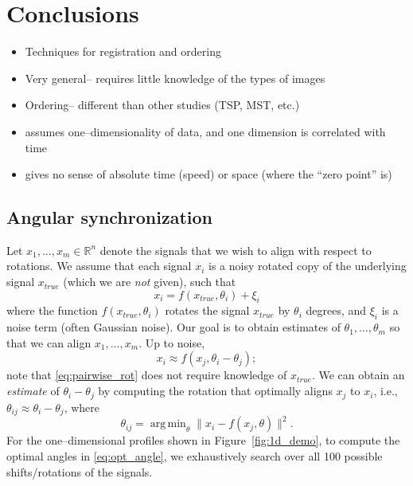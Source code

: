 \documentclass{pnastwo}
\DeclareMathOperator*{\argmin}{arg\,min}
\begin{document}
\begin{article}
\section{Conclusions}

\begin{itemize}

\item Techniques for registration and ordering
\item Very general-- requires little knowledge of the types of images
\item Ordering-- different than other studies (TSP, MST, etc.)
\item assumes one--dimensionality of data, and one dimension is correlated with time
\item gives no sense of absolute time (speed) or space (where the ``zero point'' is)
\end{itemize}






\begin{materials}

\section{Angular synchronization}

Let $x_1, \dots, x_m \in \mathbb{R}^n$ denote the signals that we wish to align with respect to rotations.
%
We assume that each signal $x_i$ is a noisy rotated copy of the underlying signal $x_{true}$ (which we are {\em not} given), such that 
\begin{equation}
x_i = f(x_{true}, \theta_i) + \xi_i
\end{equation}
where the function $f(x_{true}, \theta_i)$ rotates the signal $x_{true}$ by $\theta_i$ degrees, and $\xi_i$ is a noise term (often Gaussian noise). 
%
Our goal is to obtain estimates of $\theta_1, \dots, \theta_m$ so that we can align $x_1, \dots, x_m$. 
%
Up to noise, 
\begin{equation} \label{eq:pairwise_rot}
x_i \approx f(x_j, \theta_i - \theta_j) ;
\end{equation}
 note that \eqref{eq:pairwise_rot} does not require knowledge of $x_{true}$.
%
We can obtain an {\em estimate} of $\theta_i - \theta_j$ by computing the rotation that optimally aligns $x_j$ to $x_i$, 
i.e., $\theta_{ij} \approx \theta_i - \theta_j$, where
%
\begin{equation} \label{eq:opt_angle}
\theta_{ij} = \argmin_{\theta} \|x_i - f(x_j, \theta)\|^2.
\end{equation}
%
For the one--dimensional profiles shown in Figure~\ref{fig:1d_demo}, to compute the optimal angles in \eqref{eq:opt_angle}, we exhaustively search over all 100 possible shifts/rotations of the signals. 


\end{materials}
\end{article}
\end{document}
